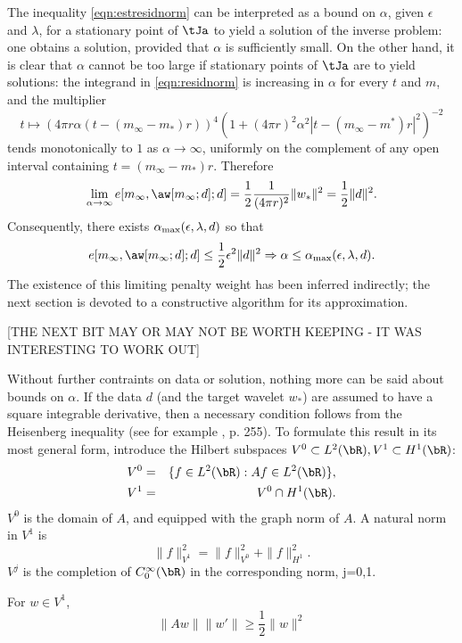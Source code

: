 The inequality \ref{eqn:estresidnorm} can be interpreted as a bound 
on $\alpha$, given $\epsilon$ and $\lambda$, for a
stationary point of $\tJa$ to yield a solution of the inverse
problem: one obtains a solution, provided that $\alpha$ is
sufficiently small. On the other hand, it is clear that $\alpha$
cannot be too large if stationary points of $\tJa$ are to yield
solutions: the integrand in \ref{eqn:residnorm} is increasing in
$\alpha$ for every $t$ and $m$, and the multiplier
\[
t \mapsto (4\pi r \alpha(t-(m_{\infty}-m_*)r))^4(1+(4\pi r)^2 \alpha^2 
|t-(m_{\infty}-m^*)r|^2)^{-2}
\]
tends monotonically to $1$ as $\alpha \rightarrow \infty$, uniformly
on the complement of any open interval containing
$t=(m_{\infty}-m_*)r$. Therefore
\begin{equation}
  \label{eqn:elimit}
  \lim_{\alpha \rightarrow \infty}e[m_{\infty},\aw[m_{\infty};d];d] =
  \frac{1}{2}\frac{1}{(4 \pi r)^2}\|w_*\|^2 = \frac{1}{2}\|d\|^2.
\end{equation}
Consequently, there exists $\alpha_{\rm max}(\epsilon,\lambda,d)$ so
that
\[
  e[m_{\infty},\aw[m_{\infty};d];d]  \le \frac{1}{2}\epsilon^2\|d\|^2
  \Rightarrow \alpha \le \alpha_{\rm max}(\epsilon,\lambda,d).
\]
The existence of this limiting penalty weight has been inferred
indirectly; the next section is devoted to a constructive algorithm
for its approximation.

[THE NEXT BIT MAY OR MAY NOT BE WORTH KEEPING - IT WAS INTERESTING TO
WORK OUT]

Without further contraints on data or solution, nothing more can be
said about bounds on $\alpha$. If the data $d$ (and the target wavelet
$w_*$) are assumed to have a square integrable derivative, then a
necessary condition follows from the Heisenberg
inequality (see for example \cite{Folland:07}, p. 255). To formulate
this result in its most general form, introduce the Hilbert subspaces
$V^0 \subset L^2(\bR), V^1 \subset H^1(\bR)$:
\begin{eqnarray}
  V^0 & = & \{ f \in L^2(\bR): Af \in L^2(\bR)\}, \nonumber\\
  V^1 & = & V^0 \cap H^1(\bR).
            \label{eqn:vdef}
\end{eqnarray}
$V^0$ is the domain of $A$, and equipped with the graph norm of $A$. A
natural norm in $V^1$ is
\[
  \|f\|^2_{V^1} = \|f\|_{V^0}^2 + \|f\|_{H^1}^2.
\]
$V^j$ is the completion of $C_0^{\infty}(\bR)$ in the corresponding
norm, j=0,1.

\begin{proposition}
  \label{thm:heis}
For $w \in V^1$,
  \begin{equation}
    \label{eqn:heis}
    \|Aw\|\|w'\| \ge \frac{1}{2}\|w\|^2
  \end{equation}
\end{proposition}

